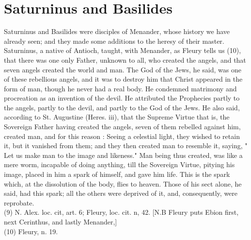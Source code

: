 \documentclass[12pt]{book}
\begin{document}
\section{Saturninus and Basilides}
Saturninus and Basilides were disciples of Menander, whose history we have already seen; and they
made some additions to the heresy of their master. Saturninus, a native of Antioch, taught, with
Menander, as Fleury tells us (10), that there was one only Father, unknown to all, who created the angels,
and that seven angels created the world and man. The God of the Jews, he said, was one of these
rebellious angels, and it was to destroy him that Christ appeared in the form of man, though he never
had a real body. He condemned matrimony and procreation as an invention of the devil. He attributed
the Prophecies partly to the angels, partly to the devil, and partly to the God of the Jews. He also said,
according to St. Augustine (Heres. iii), that the Supreme Virtue that is, the Sovereign Father having
created the angels, seven of them rebelled against him, created man, and for this reason : Seeing a celestial
light, they wished to retain it, but it vanished from them; and they then created man to resemble it,
saying, " Let us make man to the image and likeness." Man being thus created, was like a mere worm,
incapable of doing anything, till the Sovereign Virtue, pitying his image, placed in him a spark of himself,
and gave him life. This is the spark which, at the dissolution of the body, flies to heaven. Those of his sect
alone, he said, had this spark; all the others were deprived of it, and, consequently, were reprobate.\\
(9) N. Alex. loc. cit, art. 6; Fleury, loc. cit. n, 42. [N.B Fleury puts Ebion first, next Cerinthus, and lastly
Menander,]\\
(10) Fleury, n. 19.\\
\end{document}
